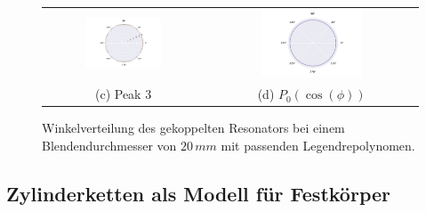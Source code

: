 \begin{figure}[H]
\begin{tabular}{cc}
  \includegraphics[width=0.5\textwidth]{Daten/Wasserstoffmolekuelion/peak2.pdf} &   \includegraphics[width=0.5\textwidth]{Daten/Wasserstoffmolekuelion/peakLeg.pdf}\\[6pt]
  (c)  Peak 3 & (d)  $P_0(\cos(\phi))$ \\[6pt]
  \end{tabular}
  \caption{Winkelverteilung des gekoppelten Resonators bei einem Blendendurchmesser von $20\, mm$ mit passenden Legendrepolynomen.} 
  \label{fig:h2_2}
\end{figure}
\subsection{Zylinderketten als Modell für Festkörper}
